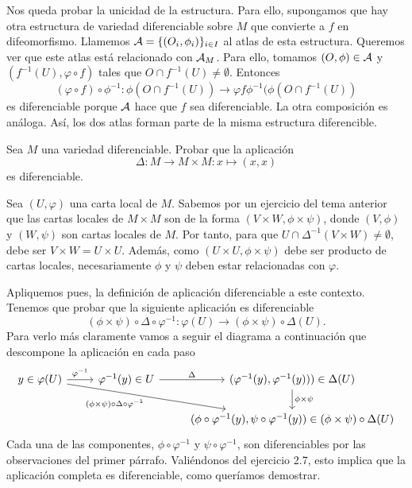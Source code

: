 \documentclass[twoside]{article}
\begin{document}
\begin{solucion}
Nos queda probar la unicidad de la estructura. Para ello, supongamos que hay otra estructura de variedad diferenciable sobre $M$ que convierte a $f$ en difeomorfismo. Llamemos $\mathcal{A}=\{(O_i,\phi_i)\}_{i\in I}$ al atlas de esta estructura. Queremos ver que este atlas está relacionado con $\mathcal{A}_M$. Para ello, tomamos $(O,\phi)\in\mathcal{A}$ y $(f^{-1}(U),\varphi\circ f)$ tales que $O\cap f^{-1}(U)\neq\emptyset$. Entonces
$$(\varphi\circ f)\circ\phi^{-1}:\phi(O\cap f^{-1}(U))\to\varphi f\phi^{-1}(\phi(O\cap f^{-1}(U))$$
es diferenciable porque $\mathcal{A}$ hace que $f$ sea diferenciable. La otra composición es análoga. Así, los dos atlas forman parte de la misma estructura diferencible.

\end{solucion}

\newpage
\begin{ejercicio}{8}
Sea $M$ una variedad diferenciable. Probar que la aplicación
$$\Delta : M \to M \times M : x \mapsto (x, x)$$
es diferenciable.
\end{ejercicio}
\begin{solucion}
Sea $(U,\varphi)$ una carta local de $M$. Sabemos por un ejercicio del tema anterior que las cartas locales de $M\times M$ son de la forma $(V\times W, \phi\times\psi)$, donde $(V,\phi)$ y $(W,\psi)$ son cartas locales de $M$. Por tanto, para que $U\cap\Delta^{-1}(V\times W)\neq\emptyset$, debe ser $V\times W=U\times U$. Además, como $(U\times U,\phi\times\psi)$ debe ser producto de cartas locales, necesariamente $\phi$ y $\psi$ deben estar relacionadas con $\varphi$. 

Apliquemos pues, la definición de aplicación diferenciable a este contexto. Tenemos que probar que la siguiente aplicación es diferenciable
$$(\phi\times\psi)\circ\Delta\circ\varphi^{-1}: \varphi(U)\to (\phi\times\psi)\circ\Delta(U).$$
Para verlo más claramente vamos a seguir el diagrama a continuación que descompone la aplicación en cada paso
\[
\begin{tikzcd}
y\in\varphi(U)\arrow[r, "\varphi^{-1}"]\arrow[drr, "(\phi\times\psi)\circ\Delta\circ\varphi^{-1}"'] & \varphi^{-1}(y)\in U\arrow[r,"\Delta"] & (\varphi^{-1}(y), \varphi^{-1}(y)))\in \Delta(U)\arrow[d,"\phi\times\psi"]\\
& &  (\phi\circ\varphi^{-1}(y),\psi\circ\varphi^{-1}(y))\in (\phi\times\psi)\circ\Delta(U)
\end{tikzcd}
\]
Cada una de las componentes, $\phi\circ\varphi^{-1}$ y $\psi\circ\varphi^{-1}$, son diferenciables por las observaciones del primer párrafo. Valiéndonos del ejercicio 2.7, esto implica que la aplicación completa es diferenciable, como queríamos demostrar.

\end{solucion}
\end{document}
